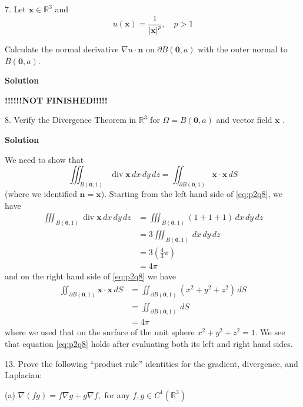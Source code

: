 \documentclass{article}
\begin{document}
\vspace{5mm}
7. Let $\mathbf{x} \in \mathbb{R}^{3}$ and
$$u(\mathbf{x}) = \frac{1}{|\mathbf{x}|^{p}}, \quad p>1$$

Calculate the normal derivative $\nabla u \cdot \mathbf{n}$ on $\partial
B(\mathbf{0}, a)$ with the outer normal to $B(\mathbf{0}, a)$.

\textbf{Solution}

\quad \textbf{!!!!!!NOT FINISHED!!!!!}

\vspace{5mm}
8. Verify the Divergence Theorem in $\mathbb{R}^{3}$ for
$\Omega = B(\mathbf{0}, a)$ and vector field $\mathbf{x}$ .

\textbf{Solution}

We need to show that
%
\begin{equation}
    \iiint_{B(\mathbf{0}, 1)} \operatorname{div} \mathbf{x} \,dx \,dy \,dz = \iint_{\partial B(\mathbf{0}, 1)} \mathbf{x} \cdot \mathbf{x} \,dS
    \label{eq:p2q8}
\end{equation}
%
(where we identified $\mathbf{n} = \mathbf{x}$). Starting from the left
hand side of \eqref{eq:p2q8}, we have
%
\begin{align*}
    \iiint_{B(\mathbf{0}, 1)} \operatorname{div} \mathbf{x} \,dx \,dy \,dz
        &= \iiint_{B(\mathbf{0}, 1)} (1 + 1 + 1) \,dx \,dy \,dz \\
        &= 3 \iiint_{B(\mathbf{0}, 1)} \,dx \,dy \,dz \\
        &= 3 \left( \frac{4}{3} \pi \right)\\
        &= 4 \pi
\end{align*}
%
and on the right hand side of \eqref{eq:p2q8} we have
%
\begin{align*}
    \iint_{\partial B(\mathbf{0}, 1)} \mathbf{x} \cdot \mathbf{x} \,dS
        &= \iint_{\partial B(\mathbf{0}, 1)} (x^2 + y^2 + z^2) \,dS \\
        &= \iint_{\partial B(\mathbf{0}, 1)} \,dS \\
        &= 4 \pi
\end{align*}
%
where we used that on the surface of the unit sphere $x^2 + y^2 + z^2 =
1$. We see that equation \eqref{eq:p2q8} holds after evaluating both its
left and right hand sides.

\vspace{5mm}
13. Prove the following ``product rule'' identities for the gradient,
divergence, and Laplacian:

(a) $\nabla(f g) = f \nabla g + g \nabla f,$ for any
$f, g \in C^{1}\left(\mathbb{R}^{3}\right)$
\end{document}
